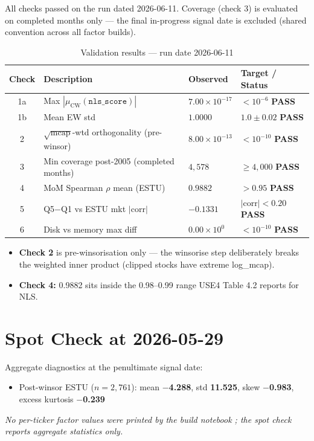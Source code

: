 \documentclass[11pt,a4paper]{article}
\newcommand{\PASS}[1]{\textcolor{pass}{\textbf{#1}}}
\newcommand{\NOTE}[1]{\textcolor{note}{\textit{#1}}}
\begin{document}
All checks passed on the run dated 2026-06-11. Coverage (check 3) is evaluated
on completed months only --- the final in-progress signal date is excluded
(shared convention across all factor builds).

\begin{table}[h!]
\centering
\caption{Validation results --- run date 2026-06-11}
\small
\begin{tabular}{clll}
\toprule
\textbf{Check} & \textbf{Description} & \textbf{Observed} & \textbf{Target / Status} \\
\midrule
1a & Max $|\mu_{\text{CW}}(\texttt{nls\_score})|$ & $7.00\times10^{-17}$ & $<10^{-6}$ \quad \PASS{PASS} \\
1b & Mean EW std & $1.0000$ & $1.0\pm0.02$ \quad \PASS{PASS} \\
2 & $\sqrt{\text{mcap}}$-wtd orthogonality (pre-winsor) & $8.00\times10^{-13}$ & $<10^{-10}$ \quad \PASS{PASS} \\
3 & Min coverage post-2005 (completed months) & $4{,}578$ & $\geq4{,}000$ \quad \PASS{PASS} \\
4 & MoM Spearman $\rho$ mean (ESTU) & $0.9882$ & $>0.95$ \quad \PASS{PASS} \\
5 & Q5$-$Q1 vs ESTU mkt $|\text{corr}|$ & $-0.1331$ & $|\text{corr}|<0.20$ \quad \PASS{PASS} \\
6 & Disk vs memory max diff & $0.00\times10^{0}$ & $<10^{-10}$ \quad \PASS{PASS} \\
\bottomrule
\end{tabular}
\end{table}

\begin{itemize}[leftmargin=*,topsep=2pt,itemsep=2pt]
  \item \textbf{Check 2} is pre-winsorisation only --- the winsorise step deliberately breaks the weighted inner product (clipped stocks have extreme log\_mcap).
  \item \textbf{Check 4:} 0.9882 sits inside the 0.98--0.99 range USE4 Table 4.2 reports for NLS.
\end{itemize}

\section{Spot Check at 2026-05-29}

Aggregate diagnostics at the penultimate signal date:

\begin{itemize}[leftmargin=*,topsep=2pt,itemsep=2pt]
  \item Post-winsor ESTU ($n=2{,}761$): mean \textbf{$-$4.288}, std \textbf{11.525}, skew \textbf{$-$0.983}, excess kurtosis \textbf{$-$0.239}
\end{itemize}

\NOTE{No per-ticker factor values were printed by the build notebook
; the spot check reports aggregate statistics only.}
\end{document}
